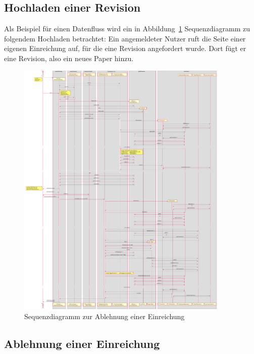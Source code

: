 
\subsection{Hochladen einer Revision}\label{subsec:sequenz-revision-hochladen}

Als Beispiel für einen Datenfluss wird ein in Abbildung~\ref{fig:upload-revision-sequence} Sequenzdiagramm zu folgendem Hochladen betrachtet:
Ein angemeldeter Nutzer ruft die Seite einer eigenen Einreichung auf, für die eine Revision angefordert wurde.
Dort fügt er eine Revision, also ein neues Paper hinzu.

\begin{figure}[H]
    \centering
    \includegraphics[width=0.9\textwidth]{graphics/upload_revision}
    \caption{Sequenzdiagramm zur Ablehnung einer Einreichung}
    \label{fig:upload-revision-sequence}
\end{figure}

\subsection{Ablehnung einer Einreichung}\label{subsec:sequenz-ablehnung}

